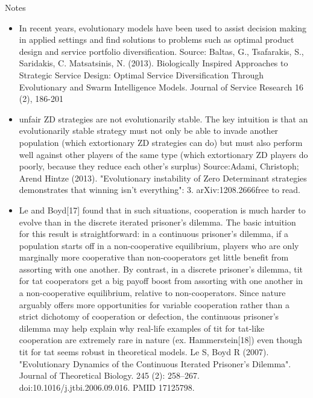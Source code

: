 \documentclass{beamer}
\begin{document}
\begin{frame}{Notes}
\begin{itemize}
\item In recent years, evolutionary models have been used to assist decision making in applied settings and find solutions to problems such as optimal product design and service portfolio diversification.
Source:  Baltas, G., Tsafarakis, S., Saridakis, C.  Matsatsinis, N. (2013). Biologically Inspired Approaches to Strategic Service Design: Optimal Service Diversification Through Evolutionary and Swarm Intelligence Models. Journal of Service Research 16 (2), 186-201

\item unfair ZD strategies are not evolutionarily stable. The key intuition is that an evolutionarily stable strategy must not only be able to invade another population (which extortionary ZD strategies can do) but must also perform well against other players of the same type (which extortionary ZD players do poorly, because they reduce each other's surplus)
Source:Adami, Christoph; Arend Hintze (2013). "Evolutionary instability of Zero Determinant strategies demonstrates that winning isn't everything": 3. arXiv:1208.2666free to read.

\item Le and Boyd[17] found that in such situations, cooperation is much harder to evolve than in the discrete iterated prisoner's dilemma. The basic intuition for this result is straightforward: in a continuous prisoner's dilemma, if a population starts off in a non-cooperative equilibrium, players who are only marginally more cooperative than non-cooperators get little benefit from assorting with one another. By contrast, in a discrete prisoner's dilemma, tit for tat cooperators get a big payoff boost from assorting with one another in a non-cooperative equilibrium, relative to non-cooperators. Since nature arguably offers more opportunities for variable cooperation rather than a strict dichotomy of cooperation or defection, the continuous prisoner's dilemma may help explain why real-life examples of tit for tat-like cooperation are extremely rare in nature (ex. Hammerstein[18]) even though tit for tat seems robust in theoretical models.
Le S, Boyd R (2007). "Evolutionary Dynamics of the Continuous Iterated Prisoner's Dilemma". Journal of Theoretical Biology. 245 (2): 258–267. doi:10.1016/j.jtbi.2006.09.016. PMID 17125798. 

\end{itemize}
\end{frame}
\end{document}
